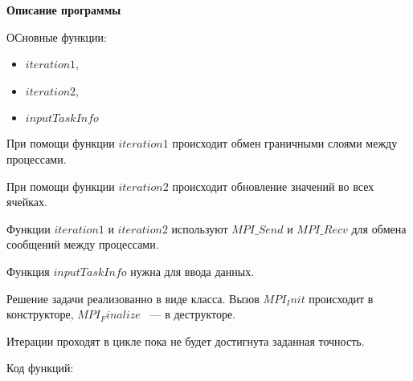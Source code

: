 \textbf{\large Описание программы}

ОСновные функции:
\begin{itemize}
    \setlength\itemsep{0.0em}
    \item $iteration1$, 
    \item $iteration2$,
    \item $inputTaskInfo$
\end{itemize}

При помощи функции $iteration1$ происходит обмен граничными слоями между процессами.

При помощи функции $iteration2$ происходит обновление значений во всех ячейках.

Функции $iteration1$ и $iteration2$ используют $MPI\_Send$ и $MPI\_Recv$ для обмена сообщений между процессами.

Функция $inputTaskInfo$ нужна для ввода данных.

Решение задачи реализованно в виде класса. Вызов $MPI_Init$ происходит в конструкторе, $MPI_Finalize$ ~--- в деструкторе.

Итерации проходят в цикле пока не будет достигнута заданная точность.

Код функций:

